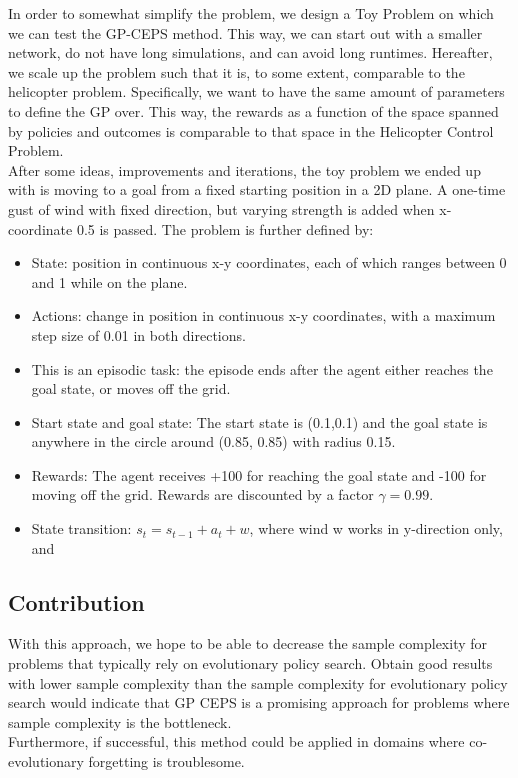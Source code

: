 In order to somewhat simplify the problem, we design a Toy Problem on which we can test the GP-CEPS method. This way, we can start out with a smaller network, do not have long simulations, and can avoid long runtimes. Hereafter, we scale up the problem such that it is, to some extent, comparable to the helicopter problem. Specifically, we want to have the same amount of parameters to define the GP over. This way, the rewards as a function of the space spanned by policies and outcomes is comparable to that space in the Helicopter Control Problem.\\
After some ideas, improvements and iterations, the toy problem we ended up with is moving to a goal from a fixed starting position in a 2D plane. A one-time gust of wind with fixed direction, but varying strength is added when x-coordinate 0.5 is passed. The problem is further defined by:
\begin{itemize}

\item State: position in continuous x-y coordinates, each of which ranges between 0 and 1 while on the plane.
\item Actions: change in position in continuous x-y coordinates, with a maximum step size of 0.01 in both directions. 
\item This is an episodic task: the episode ends after the agent either reaches the goal state, or moves off the grid.
\item Start state and goal state: The start state is (0.1,0.1) and the goal state is anywhere in the circle around (0.85, 0.85) with radius 0.15.
\item Rewards: The agent receives +100 for reaching the goal state and -100 for moving off the grid. Rewards are discounted by a factor $\gamma =  0.99$.
\item State transition: $s_t = s_{t-1} + a_t + w$, where wind w works in y-direction only, and %
\end{itemize} 

\subsection{Contribution}
With this approach, we hope to be able to decrease the sample complexity for problems that typically rely on evolutionary policy search. Obtain good results with lower sample complexity than the sample complexity for evolutionary policy search would indicate that GP CEPS is a promising approach for problems where sample complexity is the bottleneck. \\
Furthermore, if successful, this method could be applied in domains where co-evolutionary forgetting is troublesome.

